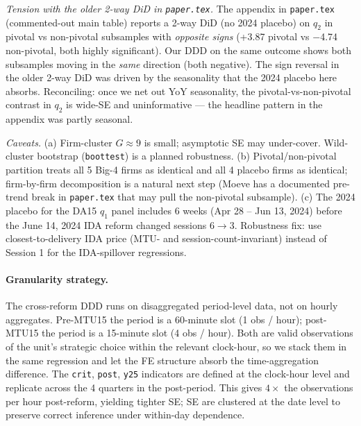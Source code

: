 \documentclass[11pt,a4paper]{article}
\newcommand{\code}[1]{\nolinkurl{#1}}
\begin{document}
\textit{Tension with the older 2-way DiD in \code{paper.tex}.}
The appendix in \code{paper.tex} (commented-out main table) reports a 2-way DiD (no 2024 placebo) on $q_2$ in pivotal vs non-pivotal subsamples with \emph{opposite signs} (+3.87 pivotal vs $-$4.74 non-pivotal, both highly significant). Our DDD on the same outcome shows both subsamples moving in the \emph{same} direction (both negative). The sign reversal in the older 2-way DiD was driven by the seasonality that the 2024 placebo here absorbs. Reconciling: once we net out YoY seasonality, the pivotal-vs-non-pivotal contrast in $q_2$ is wide-SE and uninformative --- the headline pattern in the appendix was partly seasonal.

\textit{Caveats.}
(a) Firm-cluster $G \approx 9$ is small; asymptotic SE may under-cover. Wild-cluster bootstrap (\code{boottest}) is a planned robustness. (b) Pivotal/non-pivotal partition treats all 5 Big-4 firms as identical and all 4 placebo firms as identical; firm-by-firm decomposition is a natural next step (Moeve has a documented pre-trend break in \code{paper.tex} that may pull the non-pivotal subsample). (c) The 2024 placebo for the DA15 $q_1$ panel includes 6 weeks (Apr 28 -- Jun 13, 2024) before the June 14, 2024 IDA reform changed sessions $6 \to 3$. Robustness fix: use closest-to-delivery IDA price (MTU- and session-count-invariant) instead of Session 1 for the IDA-spillover regressions.






\paragraph{Granularity strategy.}
The cross-reform DDD runs on disaggregated period-level data, not on hourly aggregates. Pre-MTU15 the period is a 60-minute slot (1 obs / hour); post-MTU15 the period is a 15-minute slot (4 obs / hour). Both are valid observations of the unit's strategic choice within the relevant clock-hour, so we stack them in the same regression and let the FE structure absorb the time-aggregation difference. The \code{crit}, \code{post}, \code{y25} indicators are defined at the clock-hour level and replicate across the 4 quarters in the post-period. This gives $4\times$ the observations per hour post-reform, yielding tighter SE; SE are clustered at the date level to preserve correct inference under within-day dependence.
\end{document}
